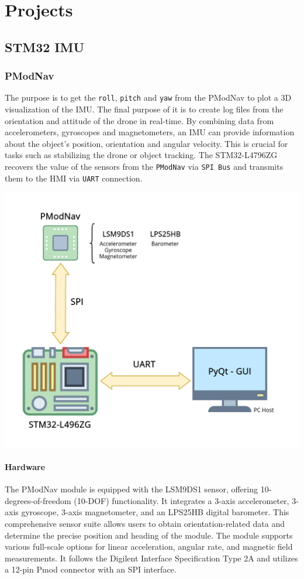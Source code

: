 \chapter{Projects}

\section{STM32 IMU}
\subsection{PModNav}
The purpose is to get the \texttt{roll}, \texttt{pitch} and \texttt{yaw} from the PModNav to plot a 3D visualization of the IMU. The final purpose of it is to create log files from the orientation and attitude of the drone in real-time. By combining data from accelerometers, gyroscopes and magnetometers, an IMU can provide information about the object’s position, orientation and angular velocity. This is crucial for tasks such as stabilizing the drone or object tracking.
The STM32-L4796ZG recovers the value of the sensors from the \texttt{PModNav} via \texttt{SPI Bus} and transmits them to the HMI via \texttt{UART} connection.
\begin{center}
    \includegraphics[width=0.65\linewidth]{./projects/pmodnav/com.png}
\end{center}

\subsubsection{Hardware}
The PModNav module is equipped with the LSM9DS1 sensor, offering 10-degrees-of-freedom (10-DOF) functionality. It integrates a 3-axis accelerometer, 3-axis gyroscope, 3-axis magnetometer, and an LPS25HB digital barometer. This comprehensive sensor suite allows users to obtain orientation-related data and determine the precise position and heading of the module. The module supports various full-scale options for linear acceleration, angular rate, and magnetic field measurements. It follows the Digilent Interface Specification Type 2A and utilizes a 12-pin Pmod connector with an SPI interface.

